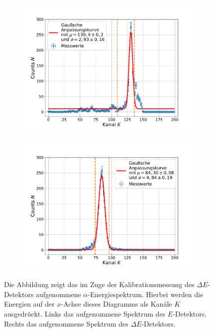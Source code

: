 \begin{figure}[ht]
	\centering
	\begin{subfigure}[c]{0.45\textwidth}		
		\centering	
		\includegraphics[width=\textwidth]{src/dEDetectorCalibrationChannelSpectrumEDetector}
		\label{fig:kalibration_E}		
	\end{subfigure}
	\begin{subfigure}[c]{0.45\textwidth}
		\centering
		\includegraphics[width=\textwidth]{src/dEDetectorCalibrationChannelSpectrumdEDetector}
		\label{fig:kalibration_dE}
	\end{subfigure}
	
	\caption{Die Abbildung zeigt das im Zuge der Kalibrationsmessung des $\Delta E$-Detektors aufgenommene $\alpha$-Energiespektrum. Hierbei werden die Energien auf der $x$-Achse dieses Diagramms als Kanäle $K$ ausgedrückt.
		Links das aufgenommene Spektrum des $E$-Detektors. Rechts das aufgenommene Spektrum des $\Delta E$-Detektors.}
	\label{fig:kalibration_dE-_E_channel}
\end{figure}

